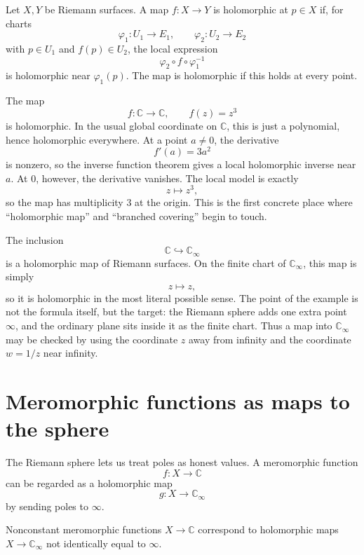 \begin{definition}
Let \(X,Y\) be Riemann surfaces.  A map \(f:X\to Y\) is holomorphic at \(p\in X\) if, for charts
\[
  \varphi_1:U_1\to E_1,\qquad \varphi_2:U_2\to E_2
\]
with \(p\in U_1\) and \(f(p)\in U_2\), the local expression
\[
  \varphi_2\circ f\circ\varphi_1^{-1}
\]
is holomorphic near \(\varphi_1(p)\).  The map is holomorphic if this holds at every point.
\end{definition}

\begin{example}
The map
\[
  f:\mathbb C\to\mathbb C,\qquad f(z)=z^3
\]
is holomorphic.  In the usual global coordinate on \(\mathbb C\), this is just a polynomial, hence holomorphic everywhere.  At a point \(a\neq0\), the derivative
\[
  f'(a)=3a^2
\]
is nonzero, so the inverse function theorem gives a local holomorphic inverse near \(a\).  At \(0\), however, the derivative vanishes.  The local model is exactly
\[
  z\mapsto z^3,
\]
so the map has multiplicity \(3\) at the origin.  This is the first concrete place where ``holomorphic map'' and ``branched covering'' begin to touch.
\end{example}

\begin{example}
The inclusion
\[
  \mathbb C\hookrightarrow \mathbb C_\infty
\]
is a holomorphic map of Riemann surfaces.  On the finite chart of \(\mathbb C_\infty\), this map is simply
\[
  z\mapsto z,
\]
so it is holomorphic in the most literal possible sense.  The point of the example is not the formula itself, but the target: the Riemann sphere adds one extra point \(\infty\), and the ordinary plane sits inside it as the finite chart.  Thus a map into \(\mathbb C_\infty\) may be checked by using the coordinate \(z\) away from infinity and the coordinate \(w=1/z\) near infinity.
\end{example}

\section{Meromorphic functions as maps to the sphere}

The Riemann sphere lets us treat poles as honest values.  A meromorphic function
\[
  f:X\to\mathbb C
\]
can be regarded as a holomorphic map
\[
  g:X\to\mathbb C_\infty
\]
by sending poles to \(\infty\).

\begin{proposition}
Nonconstant meromorphic functions \(X\to\mathbb C\) correspond to holomorphic maps \(X\to\mathbb C_\infty\) not identically equal to \(\infty\).
\end{proposition}

